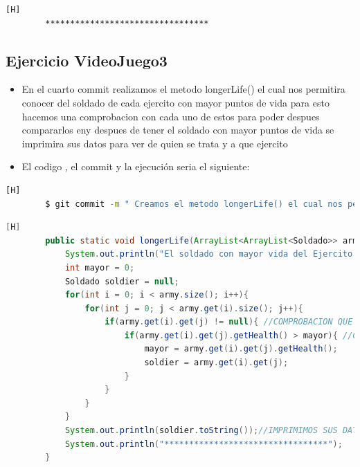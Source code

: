 \documentclass{article}
\begin{document}
\begin{lstlisting}[language=bash,caption={La ejecución: \textcolor{red}{PARA PODER VER LA TABLA COMPLETAMENTE MIRAR LA PLANTILLA DE LATEX O EJECUTARLO: }}][H]
		*********************************
	\end{lstlisting}
	\subsection{Ejercicio VideoJuego3}
	\begin{itemize}	
		\item En el cuarto commit realizamos el metodo longerLife() el cual nos permitira conocer del soldado de cada ejercito con mayor puntos de vida para esto hacemos una comprobacion con cada uno de estos para poder despues compararlos eny despues de tener el soldado con mayor puntos de vida se imprimira sus datos para ver de quien se trata y a que ejercito
		\item El codigo , el commit  y la ejecución seria el siguiente:
	\end{itemize}	
	\begin{lstlisting}[language=bash,caption={Commit}][H]
		$ git commit -m " Creamos el metodo longerLife() el cual nos permitira conocer del soldado de cada ejercito con mayor puntos de vida para esto hacemos una comprobacion con cada uno de estos para poder despues compararlos eny despues de tener el soldado con mayor puntos de vida se imprimira sus datos para ver de quien se trata y a que ejercito
	\end{lstlisting}	
	\begin{lstlisting}[language=java,caption={Las lineas de codigos del metodo creado:}][H]
		public static void longerLife(ArrayList<ArrayList<Soldado>> army, int num){
			System.out.println("El soldado con mayor vida del Ejercito " + num + " es: "); //METODO CREADO PARA PODER PERMITIRNOS A CONOCER EL SOLDADO CON MAYOR VIDA DE CADA EJERCITO 
			int mayor = 0;
			Soldado soldier = null;
			for(int i = 0; i < army.size(); i++){
				for(int j = 0; j < army.get(i).size(); j++){
					if(army.get(i).get(j) != null){ //COMPROBACION QUE HACEMOS PARA PODER DECIR QUE EL CASILLERO DONDE ESTAMOS ES UN SOLDADO QUE EXISTE
						if(army.get(i).get(j).getHealth() > mayor){ //COMPARAMOS PUNTOS DE VIDA DE CADA SOLDADO PARA VER QUIEN ES EL MAYOR 
							mayor = army.get(i).get(j).getHealth();
							soldier = army.get(i).get(j);
						}
					}
				}
			}
			System.out.println(soldier.toString());//IMPRIMIMOS SUS DATOS PARA PODER VER DE QUE SOLDADO SE TRATA 
			System.out.println("*********************************");
		}
	\end{lstlisting}
\end{document}
